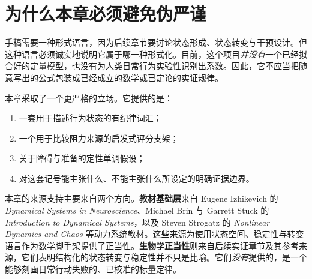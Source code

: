 \section{为什么本章必须避免伪严谨}

手稿需要一种形式语言，因为后续章节要讨论状态形成、状态转变与干预设计。但这种语言必须诚实地说明它属于哪一种形式化。目前，这个项目\emph{并没有}一个已经拟合好的定量模型，也没有为人类日常行为实验性识别出系数。因此，它不应当把随意写出的公式包装成已经成立的数学或已定论的实证规律。

本章采取了一个更严格的立场。它提供的是：
\begin{enumerate}[nosep]
  \item 一套用于描述行为状态的有纪律词汇；
  \item 一个用于比较阻力来源的启发式评分支架；
  \item 关于障碍与准备的定性单调假设；
  \item 对这套记号能主张什么、不能主张什么所设定的明确证据边界。
\end{enumerate}

\begin{discussion}
本章的来源支持主要来自两个方向。\textbf{教材基础层}来自 Eugene Izhikevich 的 \emph{Dynamical Systems in Neuroscience}、Michael Brin 与 Garrett Stuck 的 \emph{Introduction to Dynamical Systems}，以及 Steven Strogatz 的 \emph{Nonlinear Dynamics and Chaos} 等动力系统教材。这些来源为使用状态空间、稳定性与转变语言作为数学脚手架提供了正当性。\textbf{生物学正当性}则来自后续实证章节及其参考来源，它们表明结构化的状态转变与稳定性并不只是比喻。它们\emph{没有}提供的，是一个能够刻画日常行动失败的、已校准的标量定律。
\end{discussion}